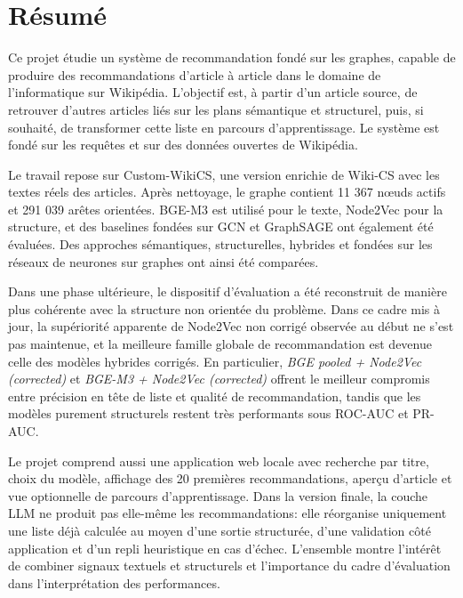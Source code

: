 \chapter{Résumé}

Ce projet étudie un système de recommandation fondé sur les graphes, capable de produire des recommandations d'article à article dans le domaine de l'informatique sur Wikipédia. L'objectif est, à partir d'un article source, de retrouver d'autres articles liés sur les plans sémantique et structurel, puis, si souhaité, de transformer cette liste en parcours d'apprentissage. Le système est fondé sur les requêtes et sur des données ouvertes de Wikipédia.

Le travail repose sur Custom-WikiCS, une version enrichie de Wiki-CS avec les textes réels des articles. Après nettoyage, le graphe contient 11 367 nœuds actifs et 291 039 arêtes orientées. BGE-M3 est utilisé pour le texte, Node2Vec pour la structure, et des baselines fondées sur GCN et GraphSAGE ont également été évaluées. Des approches sémantiques, structurelles, hybrides et fondées sur les réseaux de neurones sur graphes ont ainsi été comparées.

Dans une phase ultérieure, le dispositif d'évaluation a été reconstruit de manière plus cohérente avec la structure non orientée du problème. Dans ce cadre mis à jour, la supériorité apparente de Node2Vec non corrigé observée au début ne s'est pas maintenue, et la meilleure famille globale de recommandation est devenue celle des modèles hybrides corrigés. En particulier, \textit{BGE pooled + Node2Vec (corrected)} et \textit{BGE-M3 + Node2Vec (corrected)} offrent le meilleur compromis entre précision en tête de liste et qualité de recommandation, tandis que les modèles purement structurels restent très performants sous ROC-AUC et PR-AUC.

Le projet comprend aussi une application web locale avec recherche par titre, choix du modèle, affichage des 20 premières recommandations, aperçu d'article et vue optionnelle de parcours d'apprentissage. Dans la version finale, la couche LLM ne produit pas elle-même les recommandations: elle réorganise uniquement une liste déjà calculée au moyen d'une sortie structurée, d'une validation côté application et d'un repli heuristique en cas d'échec. L'ensemble montre l'intérêt de combiner signaux textuels et structurels et l'importance du cadre d'évaluation dans l'interprétation des performances.
